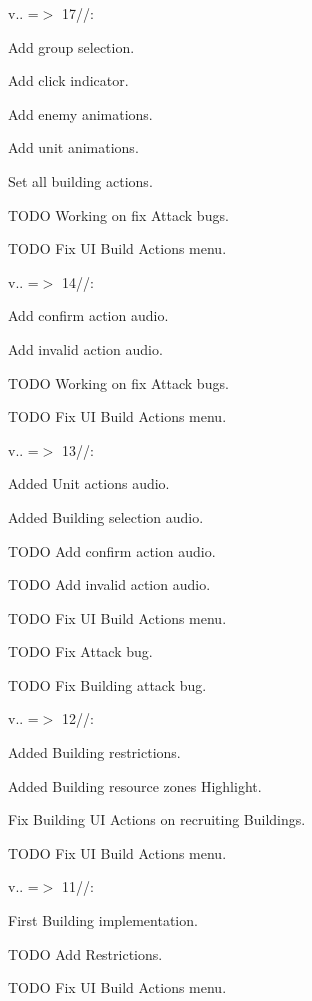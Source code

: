 v.. =\texorpdfstring{$>$}{>} 17//:\+
\begin{DoxyItemize}
\item Add group selection.
\item Add click indicator.
\item Add enemy animations.
\item Add unit animations.
\item Set all building actions.
\item TODO Working on fix Attack bugs.
\item TODO Fix UI Build Actions menu.
\end{DoxyItemize}

v.. =\texorpdfstring{$>$}{>} 14//:\+
\begin{DoxyItemize}
\item Add confirm action audio.
\item Add invalid action audio.
\item TODO Working on fix Attack bugs.
\item TODO Fix UI Build Actions menu.
\end{DoxyItemize}

v.. =\texorpdfstring{$>$}{>} 13//:\+
\begin{DoxyItemize}
\item Added Unit actions audio.
\item Added Building selection audio.
\item TODO Add confirm action audio.
\item TODO Add invalid action audio.
\item TODO Fix UI Build Actions menu.
\item TODO Fix Attack bug.
\item TODO Fix Building attack bug.
\end{DoxyItemize}

v.. =\texorpdfstring{$>$}{>} 12//:\+
\begin{DoxyItemize}
\item Added Building restrictions.
\item Added Building resource zones Highlight.
\item Fix Building UI Actions on recruiting Buildings.
\item TODO Fix UI Build Actions menu.
\end{DoxyItemize}

v.. =\texorpdfstring{$>$}{>} 11//:\+
\begin{DoxyItemize}
\item First Building implementation.
\item TODO Add Restrictions.
\item TODO Fix UI Build Actions menu.
\end{DoxyItemize}

